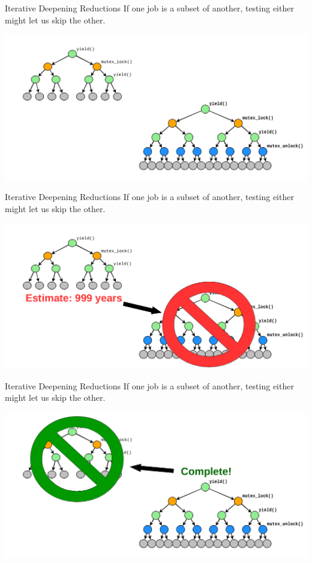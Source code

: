 \documentclass[xcolor=dvipsnames]{beamer}
\begin{document}
\begin{frame}{Iterative Deepening Reductions}
	If one job is a subset of another, testing either might let us skip the other.
	\begin{center}
		\includegraphics[width=\textwidth]{../../oopsla/reduction-nothing.png}
	\end{center}
\end{frame}
\begin{frame}{Iterative Deepening Reductions}
	If one job is a subset of another, testing either might let us skip the other.
	\begin{center}
		\includegraphics[width=\textwidth]{../../oopsla/reduction-deferred.png}
	\end{center}
\end{frame}
\begin{frame}{Iterative Deepening Reductions}
	If one job is a subset of another, testing either might let us skip the other.
	\begin{center}
		\includegraphics[width=\textwidth]{../../oopsla/reduction-complete.png}
	\end{center}
\end{frame}
\end{document}
